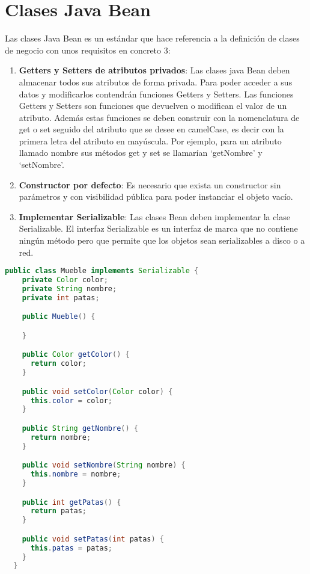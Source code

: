 \chapter{Clases Java Bean\label{09javaBean}}

Las clases Java Bean es un estándar que hace referencia a la definición de clases de negocio con unos requisitos en concreto 3:

\begin{enumerate}
  \item \textbf{Getters y Setters de atributos privados}: Las clases java Bean deben almacenar todos sus atributos de forma privada. Para poder acceder a sus datos y modificarlos contendrán funciones Getters y Setters. Las funciones Getters y Setters son funciones que devuelven o modifican el valor de un atributo. Además estas funciones se deben construir con la nomenclatura de get o set seguido del atributo que se desee en camelCase, es decir con la primera letra del atributo en mayúscula. Por ejemplo, para un atributo llamado nombre sus métodos get y set se llamarían `getNombre' y `setNombre'.
  \item \textbf{Constructor por defecto}: Es necesario que exista un constructor sin parámetros y con visibilidad pública para poder instanciar el objeto vacío.
  \item \textbf{Implementar Serializable}: Las clases Bean deben implementar la clase Serializable. El interfaz Serializable es un interfaz de marca que no contiene ningún método pero que permite que los objetos sean serializables a disco o a red.
\end{enumerate}

\begin{lstlisting}[language=java]
  public class Mueble implements Serializable {
    private Color color;
    private String nombre;
    private int patas;

    public Mueble() {

    }

    public Color getColor() {
      return color;
    }

    public void setColor(Color color) {
      this.color = color;
    }

    public String getNombre() {
      return nombre;
    }

    public void setNombre(String nombre) {
      this.nombre = nombre;
    }

    public int getPatas() {
      return patas;
    }

    public void setPatas(int patas) {
      this.patas = patas;
    }
  }
\end{lstlisting}

